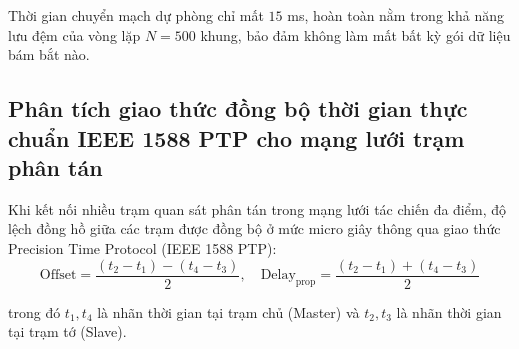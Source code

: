 \begin{table}[H]
\centering
\caption{Chỉ tiêu thiết kế thời gian phát hiện mất kết nối và chuyển mạch tự động kênh truyền thông (giá trị ước lượng)}
\label{tab:dual-link-failover-metrics-w15}
\end{table}

Thời gian chuyển mạch dự phòng chỉ mất $15$ ms, hoàn toàn nằm trong khả năng lưu đệm của vòng lặp $N = 500$ khung, bảo đảm không làm mất bất kỳ gói dữ liệu bám bắt nào.

\subsection{Phân tích giao thức đồng bộ thời gian thực chuẩn IEEE 1588 PTP cho mạng lưới trạm phân tán}

\hspace{0.5cm} Khi kết nối nhiều trạm quan sát phân tán trong mạng lưới tác chiến đa điểm, độ lệch đồng hồ giữa các trạm được đồng bộ ở mức micro giây thông qua giao thức Precision Time Protocol (IEEE 1588 PTP):
\begin{equation}
\text{Offset} = \frac{(t_2 - t_1) - (t_4 - t_3)}{2}, \quad \text{Delay}_{\text{prop}} = \frac{(t_2 - t_1) + (t_4 - t_3)}{2}
\label{eq:ptp-ieee1588-equations-w15}
\end{equation}

trong đó $t_1, t_4$ là nhãn thời gian tại trạm chủ (Master) và $t_2, t_3$ là nhãn thời gian tại trạm tớ (Slave).

